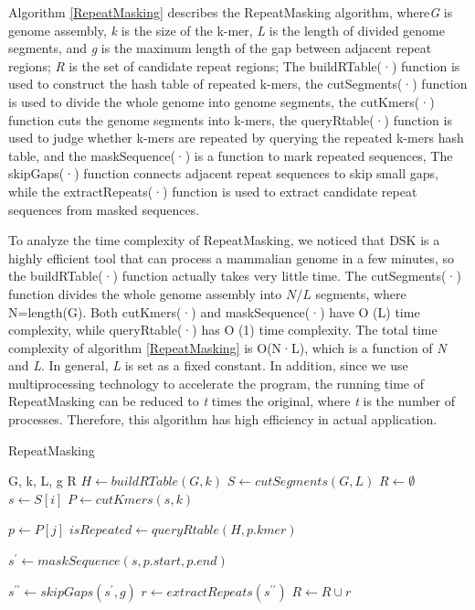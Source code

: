 \documentclass{bmcart}
\begin{document}
Algorithm \ref{RepeatMasking} describes the RepeatMasking algorithm, where\emph{G} is genome assembly, \emph{k} is the size of the k-mer, \emph{L} is the length of divided genome segments, and \emph{g} is the maximum length of the gap between adjacent repeat regions; \emph{R} is the set of candidate repeat regions; The buildRTable(·) function is used to construct the hash table of repeated k-mers, the cutSegments(·) function is used to divide the whole genome into genome segments, the cutKmers(·) function cuts the genome segments into k-mers, the queryRtable(·) function is used to judge whether k-mers are repeated by querying the repeated k-mers hash table, and the maskSequence(·) is a function to mark repeated sequences, The skipGaps(·) function connects adjacent repeat sequences to skip small gaps, while the extractRepeats(·) function is used to extract candidate repeat sequences from masked sequences.

To analyze the time complexity of RepeatMasking, we noticed that DSK is a highly efficient tool that can process a mammalian genome in a few minutes, so the buildRTable(·) function actually takes very little time. The cutSegments(·) function divides the whole genome assembly into $N/L$ segments, where N=length(G). Both cutKmers(·) and maskSequence(·) have O (L) time complexity, while queryRtable(·) has O (1) time complexity. The total time complexity of algorithm \ref{RepeatMasking} is O(N·L), which is a function of \emph{N} and \emph{L}. In general, \emph{L} is set as a fixed constant. In addition, since we use multiprocessing technology to accelerate the program, the running time of RepeatMasking can be reduced to \emph{t} times the original, where \emph{t} is the number of processes. Therefore, this algorithm has high efficiency in actual application.
\begin{algorithm}  
	\caption{RepeatMasking}\label{RepeatMasking}
	\begin{algorithmic}[1]  
		\Require 
		G, k, L, g
		\Ensure 
		R
		\State $H \gets buildRTable(G, k)$
		\State $S \gets cutSegments(G, L)$
		\State $R \gets \emptyset$
		\State $s \gets S[i]$
		\State $P \gets cutKmers(s, k)$
		
		\State $p \gets P[j]$
		\State $isRepeated \gets queryRtable(H, p.kmer)$
		
		\State $s^{\prime} \gets maskSequence(s, p.start, p.end)$          
		\EndIf
		
		\EndFor 
		
		\State $s^{\prime \prime} \gets skipGaps(s^{\prime}, g)$ 
		\State $r \gets extractRepeats(s^{\prime \prime})$ 
		\State $R \gets R \cup r$ 
		
		\EndFor             
		\EndFunction
	\end{algorithmic}  
\end{algorithm}
\end{document}
